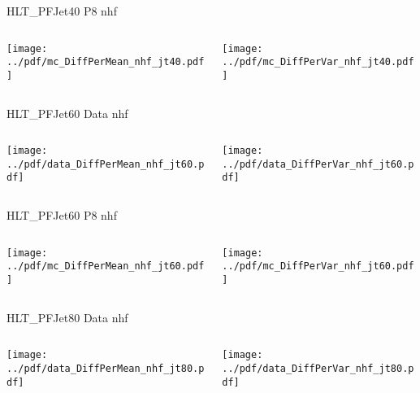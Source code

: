 \documentclass[9pt]{beamer}
\begin{document}
\begin{frame}[t]{HLT\_PFJet40 P8 nhf}
\begin{columns}[T]
  \begin{column}{.5\textwidth}
  \texttt{[image: ../pdf/mc\_DiffPerMean\_nhf\_jt40.pdf]}
  \end{column}
  \begin{column}{.5\textwidth}
  \texttt{[image: ../pdf/mc\_DiffPerVar\_nhf\_jt40.pdf]}
  \end{column}
\end{columns}
\end{frame}

\begin{frame}[t]{HLT\_PFJet60 Data nhf}
\begin{columns}[T]
  \begin{column}{.5\textwidth}
  \texttt{[image: ../pdf/data\_DiffPerMean\_nhf\_jt60.pdf]}
  \end{column}
  \begin{column}{.5\textwidth}
  \texttt{[image: ../pdf/data\_DiffPerVar\_nhf\_jt60.pdf]}
  \end{column}
\end{columns}
\end{frame}

\begin{frame}[t]{HLT\_PFJet60 P8 nhf}
\begin{columns}[T]
  \begin{column}{.5\textwidth}
  \texttt{[image: ../pdf/mc\_DiffPerMean\_nhf\_jt60.pdf]}
  \end{column}
  \begin{column}{.5\textwidth}
  \texttt{[image: ../pdf/mc\_DiffPerVar\_nhf\_jt60.pdf]}
  \end{column}
\end{columns}
\end{frame}

\begin{frame}[t]{HLT\_PFJet80 Data nhf}
\begin{columns}[T]
  \begin{column}{.5\textwidth}
  \texttt{[image: ../pdf/data\_DiffPerMean\_nhf\_jt80.pdf]}
  \end{column}
  \begin{column}{.5\textwidth}
  \texttt{[image: ../pdf/data\_DiffPerVar\_nhf\_jt80.pdf]}
  \end{column}
\end{columns}
\end{frame}
\end{document}
